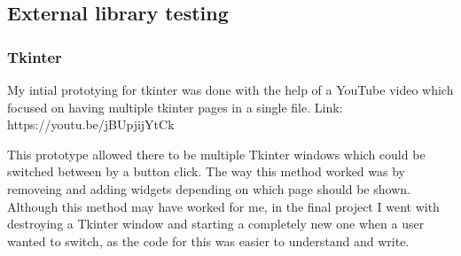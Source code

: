 \documentclass[11pt, a4paper]{article}
\begin{document}
\subsection{External library testing}
\subsubsection{Tkinter}
My intial prototying for tkinter was done with the help of a YouTube video which focused on having multiple tkinter pages in a single file.
Link: https://youtu.be/jBUpjijYtCk

This prototype allowed there to be multiple Tkinter windows which could be switched between by a button click. The way this method worked was by removeing and adding widgets depending on which page should be shown. Although this method may have worked for me, in the final project I went with destroying a Tkinter window and starting a completely new one when a user wanted to switch, as the code for this was easier to understand and write. 
\end{document}
